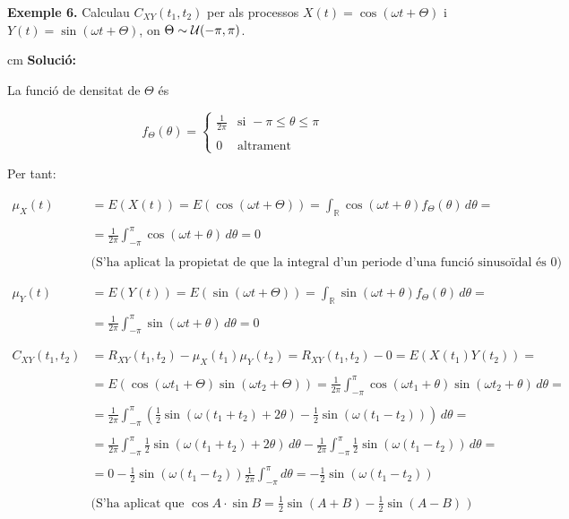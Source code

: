\documentclass{article}
\newcommand\R{\mathbb{R}}
\begin{document}
\newpage 
\noindent
\textbf{Exemple 6.}
Calculau $C_{XY}(t_1, t_2)$ per als processos $X(t)=\cos(\omega t + \Theta)$
i $Y(t)=\sin(\omega t + \Theta)$, on $\Theta \sim {\cal U}(-\pi, \pi)$.

 cm
\noindent
\textbf{Soluci\'o:}

\noindent
La funci\'o de densitat de ${\Theta}$ \'es

\[
f_{\Theta}(\theta)=\begin{cases} \frac{1}{2\pi} & \text{si } -\pi \leq \theta \leq \pi \\ \\
0 & \text{altrament} \end{cases}
\]

\noindent
Per tant:

\[
\begin{array}{ll}
\mu_X(t)& =E(X(t))=E(\cos(\omega t + \Theta))=\int_{\R} \cos(\omega t + \theta) f_{\Theta}(\theta) \, d\theta = \\ \\
& = \frac{1}{2\pi} \int_{-\pi}^{\pi} \cos(\omega t + \theta) \, d\theta = 0 \\ \\

& \text{(S'ha aplicat la propietat de que la integral d'un periode d'una funci\'o sinuso\"idal \'es 0)} \\ \\

\\

\mu_Y(t)& =E(Y(t))=E(\sin(\omega t + \Theta))=\int_{\R} \sin(\omega t + \theta) f_{\Theta}(\theta) \, d\theta = \\ \\
& = \frac{1}{2\pi} \int_{-\pi}^{\pi} \sin(\omega t + \theta) \, d\theta = 0 \\ \\ \\

C_{XY}(t_1, t_2) &= R_{XY}(t_1, t_2) - \mu_X(t_1) \mu_Y(t_2) = R_{XY}(t_1, t_2) - 0 = E(X(t_1) Y(t_2)) = \\ \\
&= E( \cos(\omega t_1 + \Theta) \sin(\omega t_2 + \Theta) ) =
 \frac{1}{2\pi} \int_{-\pi}^{\pi}  \cos(\omega t_1 + \theta) \sin(\omega t_2 + \theta) \, d\theta = \\ \\
&=\frac{1}{2\pi} \int_{-\pi}^{\pi}  \left( \frac{1}{2} \sin(\omega(t_1+t_2)+2\theta) - \frac{1}{2} \sin(\omega(t_1-t_2)) \right) \, d\theta= \\ \\
&= \frac{1}{2\pi} \int_{-\pi}^{\pi} \frac{1}{2} \sin(\omega(t_1+t_2)+2\theta) \, d\theta - 
\frac{1}{2\pi} \int_{-\pi}^{\pi} \frac{1}{2} \sin(\omega(t_1-t_2)) \, d\theta = \\ \\
&= 0 - \frac{1}{2} \sin(\omega(t_1-t_2)) \frac{1}{2\pi} \int_{-\pi}^{\pi}  d\theta = - \frac{1}{2} \sin(\omega(t_1-t_2)) \\ \\
& \text{(S'ha aplicat que $\cos A \cdot \sin B = \frac{1}{2} \sin(A+B) - \frac{1}{2} \sin (A-B) $ )}
\end{array}
\]
\end{document}
